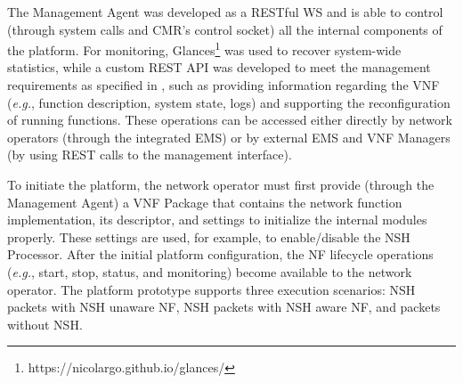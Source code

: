 
The Management Agent was developed as a RESTful WS and is able to control (through system calls and CMR's control socket) all the internal components of the platform. For monitoring, Glances\footnote{https://nicolargo.github.io/glances/} was used to recover system-wide statistics, while a custom REST API was developed to meet the management requirements as specified in \cite{Bondan-2014}, such as providing information regarding the VNF (\textit{e.g.}, function description, system state, logs) and supporting the reconfiguration of running functions. These operations can be accessed either directly by network operators (through the integrated EMS) or by external EMS and VNF Managers (by using REST calls to the management interface).

To initiate the platform, the network operator must first provide (through the Management Agent) a VNF Package that contains the network function implementation, its descriptor, and settings to initialize the internal modules properly. These settings are used, for example, to enable/disable the NSH Processor. After the initial platform configuration, the NF lifecycle operations (\textit{e.g.}, start, stop, status, and monitoring) become available to the network operator. The platform prototype supports three execution scenarios: NSH packets with NSH unaware NF, NSH packets with NSH aware NF, and packets without NSH.


